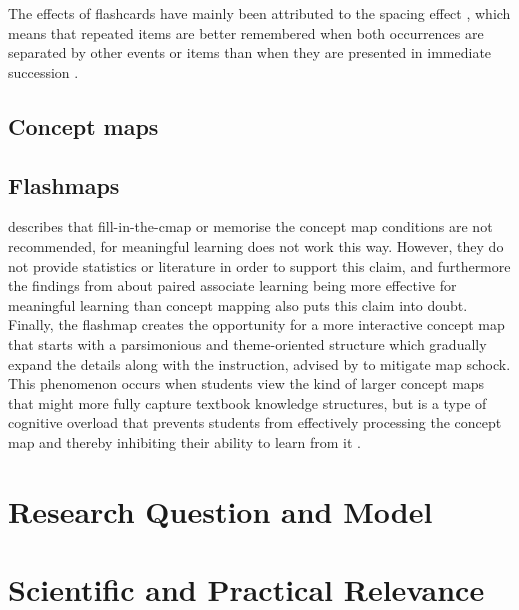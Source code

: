 The effects of flashcards have mainly been attributed to the spacing effect \cite{nakata, microlearning}, which means that repeated items are better remembered when both occurrences are separated by other events or items than when they are presented in immediate succession \cite{verkoeijen, logan, siegel, xue, karpicke2}.

\subsection{Concept maps}




\subsection{Flashmaps}

 describes that fill-in-the-cmap or memorise the concept map conditions are not recommended, for meaningful learning does not work this way. However, they do not provide statistics or literature in order to support this claim, and furthermore the findings from  about paired associate learning being more effective for meaningful learning than concept mapping also puts this claim into doubt. Finally, the flashmap creates the opportunity for a more interactive concept map that starts with a parsimonious and theme-oriented structure which gradually expand the details along with the instruction, advised by  to mitigate map schock. This phenomenon occurs when students view the kind of larger concept maps that might more fully capture textbook knowledge structures, but is a type of cognitive overload that prevents students from effectively processing the concept map and thereby inhibiting their ability to learn from it \cite{moore}.

\section{Research Question and Model}


\section{Scientific and Practical Relevance}


